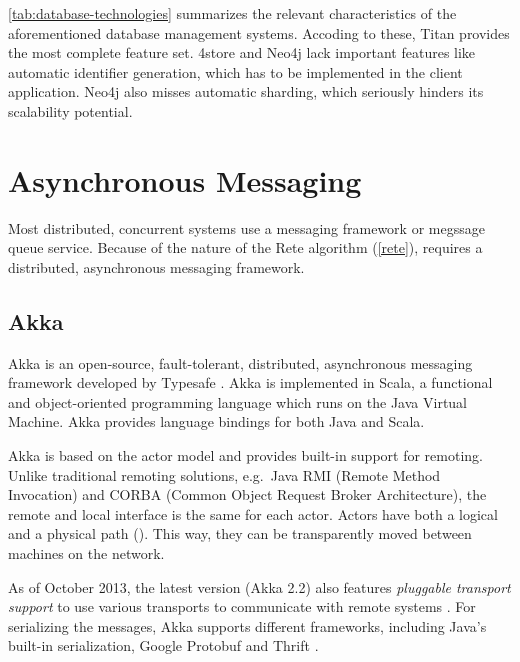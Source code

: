 \autoref{tab:database-technologies} summarizes the relevant characteristics of the aforementioned database management systems. Accoding to these, Titan provides the most complete feature set. 4store and Neo4j lack important features like automatic identifier generation, which has to be implemented in the client application. Neo4j also misses automatic sharding, which seriously hinders its scalability potential. 

\section{Asynchronous Messaging}

Most distributed, concurrent systems use a messaging framework or megssage queue service. Because of the nature of the Rete algorithm (\autoref{rete}), \iqd{} requires a distributed, asynchronous messaging framework.

\subsection{Akka}
\label{subsec:akka}

Akka is an open-source, fault-tolerant, distributed, asynchronous messaging framework developed by Typesafe \cite{Akka}.
Akka is implemented in Scala, a functional and object-oriented programming language which runs on the Java Virtual Machine. Akka provides language bindings for both Java and Scala.


Akka is based on the actor model \cite{Hewitt:1973:UMA:1624775.1624804} and provides built-in support for remoting. %
Unlike traditional remoting solutions, e.g.\ Java RMI (Remote Method Invocation) and CORBA (Common Object Request Broker Architecture), the remote and local interface is the same for each actor. Actors have both a logical and a physical path (). This way, they can be transparently moved between machines on the network.

As of October 2013, the latest version (Akka 2.2) also features \textit{pluggable transport support} to use various transports to communicate with remote systems \cite{Akka}. For serializing the messages, Akka supports different frameworks, including Java's built-in serialization, Google Protobuf \cite{Protobuf} and Thrift \cite{Thrift}.


